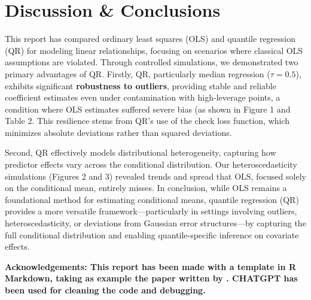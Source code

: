 \documentclass[fleqn,10pt]{latex/stylish_article} %
\begin{document}
\section{Discussion \& Conclusions}\label{discussion-conclusions}

This report has compared ordinary least squares (OLS) and quantile regression (QR) for modeling linear relationships, focusing on scenarios where classical OLS assumptions are violated. Through controlled simulations, we demonstrated two primary advantages of QR. Firstly, QR, particularly median regression (\(\tau=0.5\)), exhibits significant \textbf{robustness to outliers}, providing stable and reliable coefficient estimates even under contamination with high-leverage points, a condition where OLS estimates suffered severe bias (as shown in Figure 1 and Table 2. This resilience stems from QR's use of the check loss function, which minimizes absolute deviations rather than squared deviations.

Second, QR effectively models distributional heterogeneity, capturing how predictor effects vary across the conditional distribution. Our heteroscedasticity simulations (Figures 2 and 3) revealed trends and spread that OLS, focused solely on the conditional mean, entirely misses. In conclusion, while OLS remains a foundational method for estimating conditional means, quantile regression (QR) provides a more versatile framework---particularly in settings involving outliers, heteroscedasticity, or deviations from Gaussian error structures---by capturing the full conditional distribution and enabling quantile-specific inference on covariate effects.

\textbf{Acknowledgements: This report has been made with a template in R Markdown, taking as example the paper written by \citet{FanLi2001}. CHATGPT has been used for cleaning the code and debugging.}



\makeatletter

\makeatother


\end{document}
